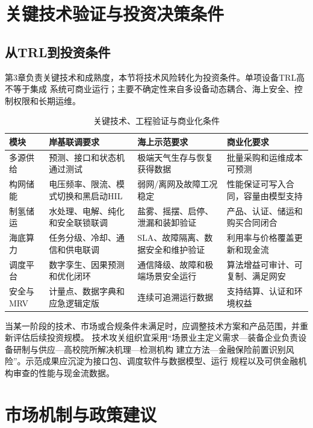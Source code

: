 \section{关键技术验证与投资决策条件}

\subsection{从TRL到投资条件}

第3章负责关键技术和成熟度，本节将技术风险转化为投资条件。单项设备TRL高不等于集成
系统可商业运行；主要不确定性来自多设备动态耦合、海上安全、控制权限和长期运维。

\begin{table}[H]
\centering
\caption{关键技术、工程验证与商业化条件}
\label{tab:c6-gates}
\footnotesize
\begin{tabularx}{\textwidth}{p{2.4cm} X X X}
\toprule
模块 & 岸基联调要求 & 海上示范要求 & 商业化要求\\
\midrule
多源供给 & 预测、接口和状态机通过测试 & 极端天气生存与恢复获得数据 & 批量采购和运维成本可预测\\
构网储能 & 电压频率、限流、模式切换和黑启动HIL & 弱网/离网及故障工况稳定 & 性能保证可写入合同，容量由模型支持\\
制氢储运 & 水处理、电解、纯化和安全联锁联调 & 盐雾、摇摆、启停、泄漏和装卸验证 & 产品、认证、储运和购买合同闭合\\
海底算力 & 任务分级、冷却、通信和供电联调 & SLA、故障隔离、数据安全和维护验证 & 利用率与价格覆盖更新和现金流\\
调度平台 & 数字孪生、因果预测和优化闭环 & 通信降级、故障和极端场景安全运行 & 算法增益可审计、可复制、满足网安\\
安全与MRV & 计量点、数据字典和应急逻辑定版 & 连续可追溯运行数据 & 支持结算、认证和环境权益\\
\bottomrule
\end{tabularx}
\end{table}

当某一阶段的技术、市场或合规条件未满足时，应调整技术方案和产品范围，并重新评估后续投资规模。
技术攻关组织宜采用“场景业主定义需求—装备企业负责设备研制与供应—高校院所解决机理—检测机构
建立方法—金融保险前置识别风险”。示范成果应沉淀为接口包、调度软件与数据模型、运行
规程以及可供金融机构审查的性能与现金流数据。

\section{市场机制与政策建议}

